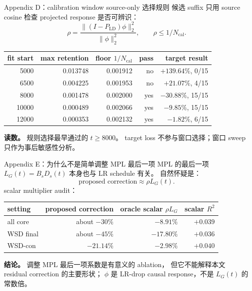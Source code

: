 \documentclass[9pt,aspectratio=169,fontset=fandol]{ctexbeamer}
\begin{document}
\begin{frame}{Appendix D：calibration window source-only 选择规则}
\small
候选 suffix 只用 source cosine 检查 projected response 是否可辨识：
\[
\rho=\frac{\|(I-P_{\mathrm{LD}})\phi\|_2^2}{\|\phi\|_2^2},
\qquad
\rho\le 1/N_{\mathrm{cal}}.
\]
\vfill
\begin{center}
\begin{tabular}{rrrrr}
\toprule
fit start & max retention & floor \(1/N_{\mathrm{cal}}\) & pass & target result\\
\midrule
5000 & 0.013748 & 0.001912 & no & \(+139.64\%\), 0/15\\
6500 & 0.004225 & 0.001953 & no & \(+21.07\%\), 4/15\\
8000 & 0.001478 & 0.002000 & yes & \(-30.88\%\), 15/15\\
10000 & 0.000489 & 0.002066 & yes & \(-9.85\%\), 15/15\\
12000 & 0.000353 & 0.002132 & yes & \(-1.82\%\), 6/15\\
\bottomrule
\end{tabular}
\end{center}
\vfill
\textbf{读数。}
规则选择最早通过的 \(t\ge8000\)。
target loss 不参与窗口选择；窗口 sweep 只作为事后敏感性分析。
\end{frame}

\begin{frame}{Appendix E：为什么不是简单调整 MPL 最后一项}
\small
MPL 的最后一项 \(L_G(t)=B_sD_s(t)\) 本身也与 LR schedule 有关。
自然怀疑是：
\[
\text{proposed correction}
\approx
\rho L_G(t).
\]
\vfill
scalar multiplier audit：
\begin{center}\small
\begin{tabular}{lrrr}
\toprule
setting & proposed correction & oracle scalar \( \rho L_G \) & scalar \(R^2\)\\
\midrule
all core & about \(-30\%\) & \(-8.91\%\) & \(+0.039\)\\
WSD final & about \(-45\%\) & \(-17.80\%\) & \(+0.036\)\\
WSD-con & \(-21.14\%\) & \(-2.98\%\) & \(+0.040\)\\
\bottomrule
\end{tabular}
\end{center}
\vfill
\textbf{结论。}
调整 MPL 最后一项系数是有意义的 ablation，
但它不能解释本文 residual correction 的主要形状；
\(\phi\) 是 LR-drop causal response，不是 \(L_G(t)\) 的常数倍。
\end{frame}
\end{document}
